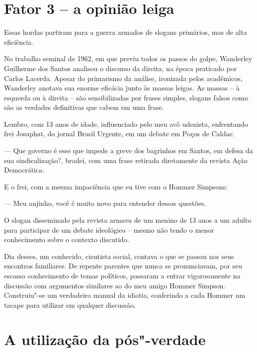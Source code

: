 \section{Fator 3 -- a opinião leiga}

 

Essas hordas partiram para a guerra armados de slogans primários, mas de
alta eficiência.

 

No trabalho seminal de 1962, em que previu todos os passos do golpe,
Wanderley Guilherme dos Santos analisou o discurso da direita, na época
praticado por Carlos Lacerda. Apesar do primarismo da análise, ironizada
pelos acadêmicos, Wanderley anotava sua enorme eficácia junto às massas
leigas. As massas -- à esquerda ou à direita -- são sensibilizadas por
frases simples, slogans falsos como são as verdades definitivas que
cabem em uma frase.

 

Lembro, com 13 anos de idade, influenciado pelo meu avô udenista,
enfrentando frei Josaphat, do jornal Brasil Urgente, em um debate em
Poços de Caldas:

 

— Que governo é esse que impede a greve dos bagrinhos em Santos, em
defesa da sua sindicalização?, bradei, com uma frase retirada
diretamente da revista Ação Democrática.

 

E o frei, com a mesma impaciência que eu tive com o Hommer Simpsons:

 

— Meu anjinho, você é muito novo para entender dessas questões.

 

O slogan disseminado pela revista armava de um menino de 13 anos a um
adulto para participar de um debate ideológico -- mesmo não tendo o
menor conhecimento sobre o contexto discutido.

 

Dia desses, um conhecido, cientista social, contava o que se passou nos
seus encontros familiares. De repente parentes que nunca se
pronunciavam, por seu escasso conhecimento de temas políticos, passaram
a entrar vigorosamente na discussão com argumentos similares ao do meu
amigo Hommer Simpson. Construiu"-se um verdadeiro manual da idiotia,
conferindo a cada Hommer um tacape para utilizar em qualquer discussão.

 

\section{A utilização da pós"-verdade}

